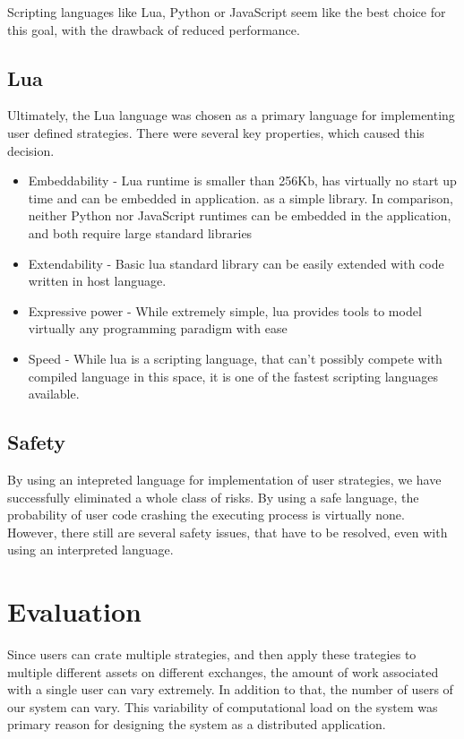 Scripting languages like Lua, Python or JavaScript seem like the best choice for this goal, with the drawback of
reduced performance.

\subsection{Lua}
Ultimately, the Lua language was chosen as a primary language for implementing user defined strategies. There were several
key properties, which caused this decision.

\begin{itemize}
    \item Embeddability - Lua runtime is smaller than 256Kb, has virtually no start up time and can be embedded in application.
    as a simple library. In comparison, neither Python nor JavaScript runtimes can be embedded in the application, and both
    require large standard libraries
    \item Extendability - Basic lua standard library can be easily extended with code written in host language.
    \item Expressive power - While extremely simple, lua provides tools to model virtually any programming paradigm with ease
    \item Speed - While lua is a scripting language, that can't possibly compete with compiled language in this space,
    it is one of the fastest scripting languages available.
\end{itemize}

\subsection{Safety}
By using an intepreted language for implementation of user strategies, we have successfully eliminated a whole
class of risks. By using a safe language, the probability of user code crashing the executing process is virtually
none. However, there still are several safety issues, that have to be resolved, even with using an interpreted language.

\section{Evaluation}
Since users can crate multiple strategies, and then apply these trategies to multiple different assets on different exchanges,
the amount of work associated with a single user can vary extremely. In addition to that, the number of users of our system can vary.
This variability of computational load on the system was primary reason for designing the system as a distributed application.

